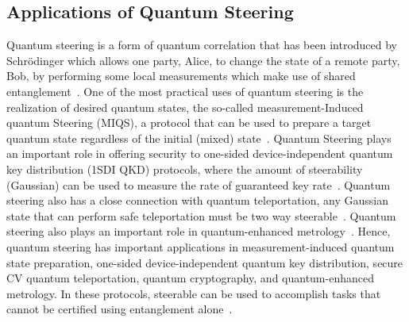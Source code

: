 \subsection{Applications of Quantum Steering}
Quantum steering is a form of quantum correlation that has been introduced by Schr\"{o}dinger which allows one party, Alice, to change the state of a remote party, Bob, by performing some local measurements which make use of shared entanglement~\cite{Schrodinger1935,WisemanJonesDoherty2007,Uola2020}.
One of the most practical uses of quantum steering is the realization of desired quantum states, the so-called measurement-Induced quantum Steering (MIQS), a protocol that can be used to prepare a target quantum state regardless of the initial (mixed) state~\cite{Volya2024}. Quantum Steering plays an important role in offering security to one-sided device-independent quantum key distribution (1SDI QKD) protocols, where the amount of steerability (Gaussian) can be used to measure the rate of guaranteed key rate~\cite{Kogias2015}.
Quantum steering also has a close connection with quantum teleportation, any Gaussian state that can perform safe teleportation must be two way steerable~\cite{Cavalcanti2017}. Quantum steering also plays an important role in quantum-enhanced metrology~\cite{Uola2020}.
Hence, quantum steering has important applications in measurement-induced quantum state preparation, one-sided device-independent quantum key distribution, secure CV quantum teleportation, quantum cryptography, and quantum-enhanced metrology. In these protocols, steerable can be used to accomplish tasks that cannot be certified using entanglement alone~\cite{WisemanJonesDoherty2007,Uola2020,Kogias2015,Cavalcanti2017}.

